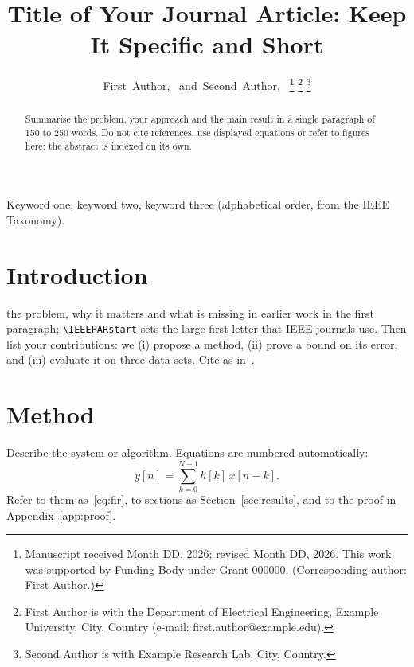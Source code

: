 \documentclass[journal]{IEEEtran}
\begin{document}
\title{Title of Your Journal Article: Keep It Specific and Short}

\author{First~Author,~
        and~Second~Author,~%
\thanks{Manuscript received Month DD, 2026; revised Month DD, 2026. This work was
supported by Funding Body under Grant 000000. (Corresponding author: First Author.)}%
\thanks{First Author is with the Department of Electrical Engineering,
Example University, City, Country (e-mail: first.author@example.edu).}%
\thanks{Second Author is with Example Research Lab, City, Country.}}

\maketitle

\begin{abstract}
Summarise the problem, your approach and the main result in a single paragraph of 150 to
250 words. Do not cite references, use displayed equations or refer to figures here:
the abstract is indexed on its own.
\end{abstract}

\begin{IEEEkeywords}
Keyword one, keyword two, keyword three (alphabetical order, from the IEEE Taxonomy).
\end{IEEEkeywords}

\section{Introduction}
 the problem, why it matters and what is missing in earlier work in
the first paragraph; \verb|\IEEEPARstart| sets the large first letter that IEEE journals
use. Then list your contributions: we (i) propose a method, (ii) prove a bound on its
error, and (iii) evaluate it on three data sets. Cite as in~\cite{shannon48,knuth84}.

\section{Method}\label{sec:method}
Describe the system or algorithm. Equations are numbered automatically:
\begin{equation}
  y[n] = \sum_{k=0}^{N-1} h[k]\, x[n-k] .
  \label{eq:fir}
\end{equation}
Refer to them as~\eqref{eq:fir}, to sections as Section~\ref{sec:results}, and to the
proof in Appendix~\ref{app:proof}.
\end{document}
